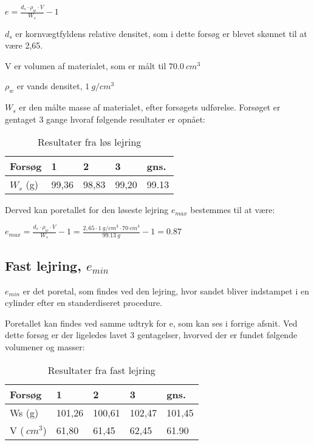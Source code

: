 $e=\frac{d_{s}\cdot \rho_{w}\cdot V}{W_{s}}-1$

$d_{s}$ er kornvægtfyldens relative densitet, som i dette forsøg er blevet skønnet til at være 2,65.

V er volumen af materialet, som er målt til $\SI{70,0}{cm^{3}}$

$\rho_{w}$ er vands densitet, $\SI{1}{g/cm^{3}}$

$W_{s}$ er den målte masse af materialet, efter forsøgets udførelse. Forsøget er gentaget 3 gange hvoraf følgende resultater er opnået:

\begin{table}[H]
\centering
\begin{tabular}{|l|l|l|l|l|}
\hline
Forsøg & 1     & 2     & 3     & gns.  \\ \hline
$W_{s}$ (g)    & 99,36 & 98,83 & 99,20 & 99.13 \\ \hline
\end{tabular}
\caption{Resultater fra løs lejring}
\label{my-label}
\end{table}

Derved kan poretallet for den løseste lejring $e_{max}$ bestemmes til at være:

$e_{max}=\frac{d_{s}\cdot \rho_{w}\cdot V}{W_{s}}-1=\frac{2,65\cdot \SI{1}{g/cm^{3}} \cdot \SI{70}{cm^{3}}}{\SI{99,13}{g}}-1=0.87$

\subsection{Fast lejring, $e_{min}$}

$e_{min}$ er det poretal, som findes ved den lejring, hvor sandet bliver indstampet i en cylinder efter en standerdiseret procedure. 

Poretallet kan findes ved samme udtryk for e, som kan ses i forrige afsnit. Ved dette forsøg er der ligeledes lavet 3 gentagelser, hvorved der er fundet  følgende volumener og masser:

\begin{table}[H]
\centering
\begin{tabular}{|l|l|l|l|l|}
\hline
Forsøg                   & 1      & 2      & 3      & gns.   \\ \hline
Ws (g)                   & 101,26 & 100,61 & 102,47 & 101,45 \\ \hline
V ($\SI{}{cm^{3}}$) & 61,80  & 61,45  & 62,45  & 61.90  \\ \hline
\end{tabular}
\caption{Resultater fra fast lejring}
\label{my-label}
\end{table}

